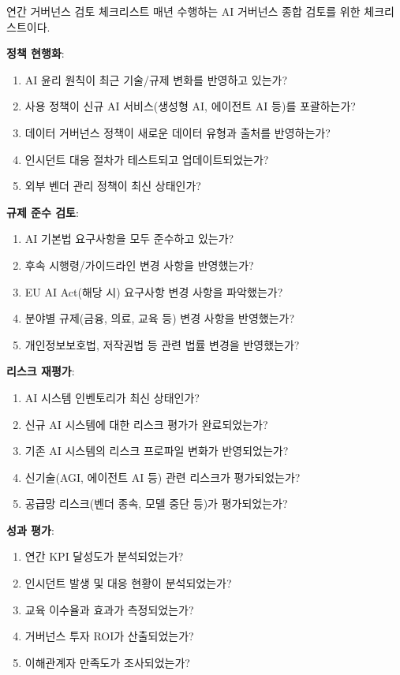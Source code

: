 \begin{practicaltool}{연간 거버넌스 검토 체크리스트}
매년 수행하는 AI 거버넌스 종합 검토를 위한 체크리스트이다.

\textbf{정책 현행화}:
\begin{enumerate}
 \item AI 윤리 원칙이 최근 기술/규제 변화를 반영하고 있는가?
 \item 사용 정책이 신규 AI 서비스(생성형 AI, 에이전트 AI 등)를 포괄하는가?
 \item 데이터 거버넌스 정책이 새로운 데이터 유형과 출처를 반영하는가?
 \item 인시던트 대응 절차가 테스트되고 업데이트되었는가?
 \item 외부 벤더 관리 정책이 최신 상태인가?
\end{enumerate}

\textbf{규제 준수 검토}:
\begin{enumerate}
 \item AI 기본법 요구사항을 모두 준수하고 있는가?
 \item 후속 시행령/가이드라인 변경 사항을 반영했는가?
 \item EU AI Act(해당 시) 요구사항 변경 사항을 파악했는가?
 \item 분야별 규제(금융, 의료, 교육 등) 변경 사항을 반영했는가?
 \item 개인정보보호법, 저작권법 등 관련 법률 변경을 반영했는가?
\end{enumerate}

\textbf{리스크 재평가}:
\begin{enumerate}
 \item AI 시스템 인벤토리가 최신 상태인가?
 \item 신규 AI 시스템에 대한 리스크 평가가 완료되었는가?
 \item 기존 AI 시스템의 리스크 프로파일 변화가 반영되었는가?
 \item 신기술(AGI, 에이전트 AI 등) 관련 리스크가 평가되었는가?
 \item 공급망 리스크(벤더 종속, 모델 중단 등)가 평가되었는가?
\end{enumerate}

\textbf{성과 평가}:
\begin{enumerate}
 \item 연간 KPI 달성도가 분석되었는가?
 \item 인시던트 발생 및 대응 현황이 분석되었는가?
 \item 교육 이수율과 효과가 측정되었는가?
 \item 거버넌스 투자 ROI가 산출되었는가?
 \item 이해관계자 만족도가 조사되었는가?
\end{enumerate}


\end{practicaltool}
